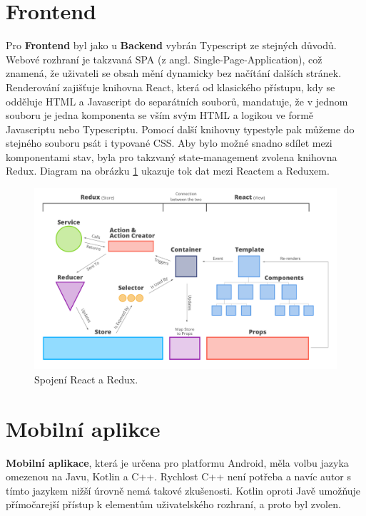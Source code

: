 \section{Frontend} \label{frontend}

Pro \textbf{Frontend} byl jako u \textbf{Backend} vybrán Typescript ze stejných důvodů. Webové rozhraní
je takzvaná SPA (z angl. Single-Page-Application), což znamená, že uživateli se obsah mění dynamicky
bez načítání dalších stránek.
Renderování zajišťuje knihovna React, která od klasického přístupu, kdy se odděluje HTML a Javascript do separátních
souborů, mandatuje, že v jednom souboru je jedna komponenta se vším svým HTML a logikou ve formě Javascriptu nebo
Typescriptu. Pomocí další knihovny typestyle pak můžeme do stejného souboru psát i typované CSS.
Aby bylo možné snadno sdílet mezi komponentami stav, byla pro takzvaný state-management zvolena knihovna Redux.
Diagram na obrázku \ref{fig:react_redux_dataflow} ukazuje tok dat mezi Reactem a Reduxem.

\begin{figure} \centering
\includegraphics[width=145mm]{../img/react-redux-architecture.png}
\caption{Spojení React a Redux. \citep[viz][]{react_redux_dataflow}}
\label{fig:react_redux_dataflow}
\end{figure}

\section{Mobilní aplikce} \label{mobile_app}

\textbf{Mobilní aplikace}, která je určena pro platformu Android, měla volbu jazyka omezenou na Javu, Kotlin a C++.
Rychlost C++ není potřeba a navíc autor s tímto jazykem nižší úrovně nemá takové zkušenosti.
Kotlin oproti Javě umožňuje přímočarejší přístup k elementům uživatelského rozhraní, a proto byl zvolen.

